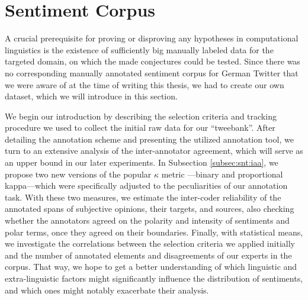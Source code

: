 

\section{Sentiment Corpus}\label{sec:snt:corpus}

A crucial prerequisite for proving or disproving any hypotheses in
computational linguistics is the existence of sufficiently big manually
labeled data for the targeted domain, on which the made conjectures
could be tested.  Since there was no corresponding manually annotated
sentiment corpus for German Twitter that we were aware of at the time
of writing this thesis, we had to create our own dataset, which we
will introduce in this section.

We begin our introduction by describing the selection criteria and
tracking procedure we used to collect the initial raw data for our
``tweebank''.  After detailing the annotation scheme and presenting
the utilized annotation tool, we turn to an extensive analysis of the
inter-annotator agreement, which will serve as an upper bound in our
later experiments.  In Subsection \ref{subsec:snt:iaa}, we propose two
new versions of the popular $\kappa$ metric \cite{Cohen:60}---binary
and proportional kappa---which were specifically adjusted to the
peculiarities of our annotation task.  With these two measures, we
estimate the inter-coder reliability of the annotated spans of
subjective opinions, their targets, and sources, also checking whether
the annotators agreed on the polarity and intensity of sentiments and
polar terms, once they agreed on their boundaries.  Finally, with
statistical means, we investigate the correlations between the
selection criteria we applied initially and the number of annotated
elements and disagreements of our experts in the corpus.  That way, we
hope to get a better understanding of which linguistic and
extra-linguistic factors might significantly influence the
distribution of sentiments, and which ones might notably exacerbate
their analysis.

